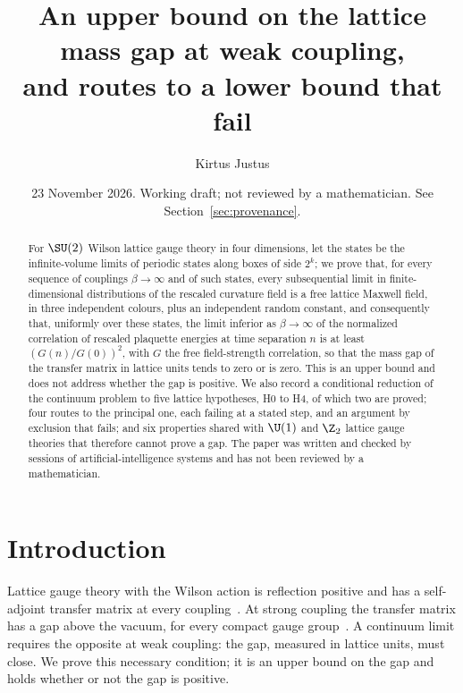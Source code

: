 
\title[An upper bound on the lattice mass gap at weak coupling]{An upper bound on the lattice mass gap at weak coupling,\\ and routes to a lower bound that fail}
\author{Kirtus Justus}
\address{Theoretical Physicist, Port Coquitlam, British Columbia, Canada}
\date{23 November 2026. Working draft; not reviewed by a mathematician. See Section~\ref{sec:provenance}.}

\begin{abstract}
For $\SU(2)$ Wilson lattice gauge theory in four dimensions, let the states be the infinite-volume limits of periodic states along boxes of side $2^k$; we prove that, for every sequence of couplings $\beta\to\infty$ and of such states, every subsequential limit in finite-dimensional distributions of the rescaled curvature field is a free lattice Maxwell field, in three independent colours, plus an independent random constant, and consequently that, uniformly over these states, the limit inferior as $\beta\to\infty$ of the normalized correlation of rescaled plaquette energies at time separation $n$ is at least $(G(n)/G(0))^2$, with $G$ the free field-strength correlation, so that the mass gap of the transfer matrix in lattice units tends to zero or is zero. This is an upper bound and does not address whether the gap is positive. We also record a conditional reduction of the continuum problem to five lattice hypotheses, H0 to H4, of which two are proved; four routes to the principal one, each failing at a stated step, and an argument by exclusion that fails; and six properties shared with $\U(1)$ and $\Z_2$ lattice gauge theories that therefore cannot prove a gap. The paper was written and checked by sessions of artificial-intelligence systems and has not been reviewed by a mathematician.
\end{abstract}
\maketitle

\section{Introduction}\label{sec:intro}

Lattice gauge theory with the Wilson action is reflection positive and has a self-adjoint transfer matrix at every coupling~\cite{OS78,Lu77}. At strong coupling the transfer matrix has a gap above the vacuum, for every compact gauge group~\cite{OS78}. A continuum limit requires the opposite at weak coupling: the gap, measured in lattice units, must close. We prove this necessary condition; it is an upper bound on the gap and holds whether or not the gap is positive.

